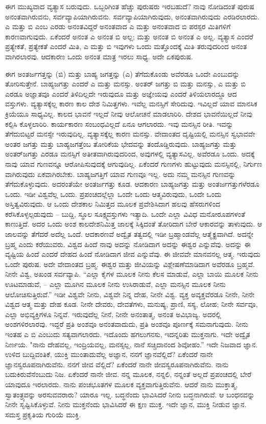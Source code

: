 ಈಗ ಮುಖ್ಯವಾದ ವ್ಯತ್ಯಾಸ ಬರುವುದು. ಒಬ್ಬರಿಗಿಂತ ಹೆಚ್ಚು ಪುರುಷರು ಇರಬಹುದೆ? ನಾವು ನೋಡಿದಂತೆ ಪುರುಷ ಅನಂತವಾಗಿರುವನು, ಸರ್ವವ್ಯಾಪಿಯಾಗಿರುವನು. ಸರ್ವವ್ಯಾಪಿಯಾಗಿರುವುದು, ಅನಂತವಾಗಿರುವುದು ಎರಡಿರಲಾರದು. ಎ ಮತ್ತು ಬಿ ಎಂಬ ಎರಡು ಅನಂತವಿದ್ದರೆ ಅನಂತವಾದ ಎ ಮತ್ತು ಅನಂತವಾದ ಬಿ ಪರಸ್ಪರ ಮಿತಿಗಳಿಗೆ ಕಾರಣವಾಗುವುದು. ಏಕೆಂದರೆ ಅನಂತ ಎ ಅನಂತ ಬಿ ಅಲ್ಲ; ಮತ್ತು ಅನಂತ ಬಿ ಅನಂತ ಎ ಅಲ್ಲ. ವ್ಯತ್ಯಾಸ ಎಂದರೆ ಪ್ರತ್ಯೇಕತೆ, ಪ್ರತ್ಯೇಕತೆ ಎಂದರೆ ಮಿತಿ, ಎ ಮತ್ತು ಬಿ ಇವುಗಳು ಒಂದು ಮತ್ತೊಂದಕ್ಕೆ ಮಿತಿ ತರುವುದರಿಂದ ಅನಂತ ವಾಗಿರಲಾರವು. ಆದಕಾರಣ ಒಂದು ಅನಂತ ಮಾತ್ರ ಇರಲು ಸಾಧ್ಯ. ಅದೇ ಏಕಪುರುಷ.

ಈಗ ಅಂತರ್ಜಗತ್ತನ್ನು (ಬಿ) ಮತ್ತು ಬಾಹ್ಯ ಜಗತ್ತನ್ನು (ಎ) ತೆಗೆದುಕೊಂಡು ಅವೆರಡೂ ಒಂದೇ ಎಂಬುದನ್ನು ತೋರಿಸುತ್ತೇನೆ. ಬಾಹ್ಯಜಗತ್ತು ಎಂದರೆ ಎ ಮತ್ತು ಮನಸ್ಸು. ಅಂತರ್‌ ಜಗತ್ತು ಬಿ ಮತ್ತು ಮನಸ್ಸು, ಎ ಮತ್ತು ಬಿ ಎರಡೂ ಅಜ್ಞಾತವೂ ಎಂದರೆ ತಿಳಿದಿಲ್ಲದೇ ಇರುವುದೂ ಮತ್ತು ಅಜ್ಞೇಯವು ಎಂದರೆ ತಿಳಿಯಲಾರದ್ದೂ ಆದ ವಸ್ತುಗಳು. ವ್ಯತ್ಯಾಸಕ್ಕೆಲ್ಲ ಕಾರಣ ಕಾಲ ದೇಶ ನಿಮಿತ್ತಗಳು. ಇವೆಲ್ಲ ಮನಸ್ಸಿಗೆ ಸೇರಿದುವು. ಇವಿಲ್ಲದೆ ಯಾವ ಮಾನಸಿಕ ಕ್ರಿಯೆಯೂ ಸಾಧ್ಯವಿಲ್ಲ. ಕಾಲದ ಭಾವನೆ ಇಲ್ಲದೆ ನೀವು ಆಲೋಚನೆ ಮಾಡಲಾರಿರಿ. ದೇಶದ ಭಾವನೆಯಿಲ್ಲದೆ ನೀವು ಕಲ್ಪಿಸಿ ಕೊಳ್ಳಲಾರಿರಿ. ಕಾರ್ಯಕಾರಣ ಸಂಬಂಧವಿಲ್ಲದೆ ಏನೂ ಆಗಲಾರದು. ಇವು ಮನಸ್ಸಿನ ರೀತಿ. ಇವನ್ನು ತೆಗೆದುಬಿಟ್ಟರೆ ಮನಸ್ಸೇ ಇರುವುದಿಲ್ಲ. ವ್ಯತ್ಯಾಸಕ್ಕೆಲ್ಲ ಕಾರಣ ಮನಸ್ಸು. ವೇದಾಂತದ ದೃಷ್ಟಿಯಲ್ಲಿ ಮನಸ್ಸಿನ ಸ್ವಭಾವವೇ ಅಂತರ ಜಗತ್ತು ಮತ್ತು ಬಾಹ್ಯಜಗತ್ತೆಂಬ ತೋರಿಕೆಯ ಭೇದವನ್ನು ತಂದೊಡ್ಡಿರುವುದು. ಬಾಹ್ಯಜಗತ್ತು ಮತ್ತು ಅಂತರ್‌ಜಗತ್ತು ಎರಡೂ ಮನಸ್ಸಿಗೆ ಅತೀತವಾಗಿರುವುದರಿಂದ, ಅವುಗಳಲ್ಲಿ ವ್ಯತ್ಯಾಸವಿಲ್ಲ. ಅವೆರಡೂ ಒಂದು. ಅದಕ್ಕೆ ನಾವು ಯಾವ ಗುಣವನ್ನೂ ಆರೋಪಿಸುವುದಕ್ಕೆ ಆಗುವುದಿಲ್ಲ. ಏಕೆಂದರೆ ಗುಣಗಳು ಹುಟ್ಟುವುದು ಮನಸ್ಸಿನಲ್ಲಿ, ನಿರ್ಗುಣ ವಾಗಿರುವುದು ಏಕವಾಗಿರಬೇಕು. ಬಾಹ್ಯಜಗತ್ತಿಗೆ ಯಾವ ಗುಣವೂ ಇಲ್ಲ. ಅದು ನಮ್ಮ ಮನಸ್ಸಿನ ಗುಣವನ್ನು ತೆಗೆದುಕೊಳ್ಳುವುದು. ಅದರಂತೆಯೇ ಅಂತರ್ಜಗತ್ತು ಕೂಡ. ಆದಕಾರಣ ಬಾಹ್ಯಜಗತ್ತು ಮತ್ತು ಅಂತರ್ಜಗತ್ತುಗಳೆರಡೂ ಒಂದು. ಇಡೀ ವಿಶ್ವವೆಲ್ಲ ಒಂದು. ಪ್ರಪಂಚದಲ್ಲೆಲ್ಲಾ ಒಂದೇ ಒಂದು ಆತ್ಮವಿರುವುದು, ಒಂದೇ ಒಂದು ಅಸ್ತಿತ್ವವಿರುವುದು. ಆ ಒಂದು ದೇಶಕಾಲ ನಿಮಿತ್ತದ ಮೂಲಕ ಪ್ರವೇಶಿಸಿದಾಗ ಹಲವು ಹೆಸರುಗಳಿಂದ ಕರೆಸಿಕೊಳ್ಳಲ್ಪಡುವುದು – ಬುದ್ದಿ, ಸ್ಥೂಲ ಸೂಕ್ಷ್ಮವಸ್ತುಗಳು ಇತ್ಯಾದಿ. ಒಂದೇ ಎಲ್ಲಾ ವಿವಿಧ ಮನೋರೂಪಗಳಂತೆ ಕಾಣುತ್ತಿದೆ. ಅದರ ಒಂದು ಅಂಶ ಕಾಲದೇಶನಿಮಿತ್ತ ಜಾಲಕ್ಕೆ ಸಿಕ್ಕಿದಂತೆ ತೋರಿದಾಗ ಬೇರೆ ಆಕಾರವನ್ನು ತಾಳುವುದು. ಆ ಜಾಲವನ್ನು ತೆಗೆದರೆ ಅದೆಲ್ಲ ಒಂದೆ. ಆದಕಾರಣವೆ ಅದ್ವೈತ ತತ್ವದಲ್ಲಿ ಇಡೀ ಬ್ರಹ್ಮಾಂಡವೆಲ್ಲ ಆತ್ಮೈಕ್ಯವಾಗಿದೆ. ಅದನ್ನೇ ಬ್ರಹ್ಮ ಎಂದು ಕರೆಯುವರು. ವಿಶ್ವದ ಹಿಂದೆ ನಾವು ಅದನ್ನು ನೋಡಿದಾಗ ಅದನ್ನು ಈಶ್ವರ ಎನ್ನುವೆವು. ಅದನ್ನು ಈ ವ್ಯಷ್ಟಿಯ ಹಿಂದೆ ಎಂದರೆ ದೇಹದ ಹಿಂದೆ ನೋಡಿದಾಗ ಜೀವ ಎನ್ನುವೆವು. ಈ ಜೀವವೇ ಮಾನವನಲ್ಲ ಆತ್ಮ. ಇರುವುದು ಒಂದೇ ಪುರುಷ. ಅದೇ ವೇದಾಂತದ ಬ್ರಹ್ಮ. ಈಶ್ವರ ಮತ್ತು ಜೀವಿಯನ್ನು ವಿಶ್ಲೇಷಣೆಮಾಡಿದಾಗ ಅವೆರಡೂ ಬ್ರಹ್ಮವೆ. ನೀನೇ ವಿಶ್ವ, ಅಖಂಡ ಸರ್ವವ್ಯಾಪಿ. “ಎಲ್ಲಾ ಕೈಗಳ ಮೂಲಕ ನೀನು ಕೆಲಸ ಮಾಡುವೆ, ಎಲ್ಲಾ ಬಾಯಿ ಮೂಲಕ ನೀನು ಊಟಮಾಡುವೆ, – ಎಲ್ಲಾ ಮೂಗಿನ ಮೂಲಕ ನೀನು ಉಸಿರಾಡುವೆ, ಎಲ್ಲಾ ಮನಸ್ಸಿನ ಮೂಲಕ ನೀನು ಆಲೋಚಿಸುತ್ತಿರುವೆ.'' ಇಡೀ ವಿಶ್ವವೇ ನೀನು, ವಿಶ್ವವೇ ನಿನ್ನ ದೇಹ, ನೀನೇ ವಿಶ್ವ. ವ್ಯಕ್ತ ಅವ್ಯಕ್ತವೆರಡೂ ನೀನೇ, ನೀನೇ ವಿಶ್ವದ ಆತ್ಮ ಮತ್ತು ದೇಹ ಕೂಡ. ನೀನೇ ದೇವರು, ದೇವತೆಗಳು, ಮನುಷ್ಯ, ಪ್ರಾಣಿ, ಸಸ್ಯ, ಲೋಹ; ನೀನೇ ಸರ್ವವೂ, ಎಲ್ಲಾ ಅಭಿವ್ಯಕ್ತಿಗಳೂ ನಿನ್ನವೆ. ಇರುವುದೆಲ್ಲ ನೀನೆ, ನೀನೇ ಅನಂತಾತ್ಮ, ಅನಂತ ಅವಿಭಾಜ್ಯ. ಅದರಲ್ಲಿ ಅಂಶಗಳಿರಲಾರವು. ಇದ್ದರೆ ಪ್ರತಿ ಅಂಶವೂ ಅನಂತವಾದುದು, ಪ್ರತಿ ಅಂಶವೂ ಪೂರ್ಣಕ್ಕೆ ಸಮನಾಗುವುದು. ನೀನು ಇಂತಹ ಎ ಬಿ ಎಂಬುದು ಸತ್ಯವಾಗಲಾರದು. ಇದೊಂದು ಹಗಲುಗನಸು, ಇದನ್ನರಿತು ಮುಕ್ತನಾಗು. ಇದೇ ಅದ್ವೈತ ನಿರ್ಣಯ. "ನಾನು ದೇಹವಲ್ಲ, ಇಂದ್ರಿಯವಲ್ಲ, ಮನಸ್ಸಲ್ಲ, ನಾನೆ ಸಚ್ಚಿದಾನಂದ ಶಿವೋಹಂ.'' ಇದೇ ನಿಜವಾದ ಜ್ಞಾನ. ಉಳಿದ ಬುದ್ದಿವಂತಿಕೆ, ಯುಕ್ತಿ ಮುಂತಾದುವೆಲ್ಲ ಅಜ್ಞಾನ, ನನಗೆ ಜ್ಞಾನವೆಲ್ಲಿದೆ? ಏಕೆಂದರೆ ನಾನೇ ಜ್ಞಾನಸ್ವರೂಪನಾಗಿರುವೆನು. ನನಗೆ ಜೀವ ವೆಲ್ಲಿದೆ? ಏಕೆಂದರೆ ನಾನೇ ಜೀವಸ್ವರೂಪನಾಗಿರುವೆನು. ನಾನು ಬದುಕಿರುವೆನೆಂಬುದು ನಿಜ. ಏಕೆಂದರೆ ನಾನೇ ಜೀವ. ನನ್ನ ಮೂಲಕ, ನನ್ನಲಿ, ನನ್ನಂತೆ ಅಲ್ಲದೆ ಪ್ರಪಂಚದಲ್ಲಿ ಬೇರೆ ಯಾವುದೂ ಇರಲಾರದು. ನಾನು ಪಂಚಭೂತಗಳ ಮೂಲಕ ವ್ಯಕ್ತವಾಗುತ್ತಿರುವೆನು. ಆದರೆ ನಾನು ಮುಕ್ತಾತ್ಮ, ಸ್ವಾತಂತ್ರ್ಯವನ್ನು ಅರಸುವವರಾರು? ಯಾರೂ ಇಲ್ಲ. ಬದ್ಧನೆಂದು ಭಾವಿಸಿದರೆ ನೀನು ಬದ್ಧನಾಗಿರುವೆ. ಆ ಬಂಧನವನ್ನು ನೀನೇ ಸೃಷ್ಟಿಸಿಕೊಳ್ಳುವೆ. ನೀನು ಮುಕ್ತನೆಂದು ಭಾವಿಸಿದರೆ ಈ ಕ್ಷಣ ಮುಕ್ತ. ಇದೇ ಜ್ಞಾನ, ಮುಕ್ತಿ ನೀಡುವ ಜ್ಞಾನ. ಸಮಸ್ತ ಪ್ರಕೃತಿಯ ಗುರಿಯೆ ಮುಕ್ತಿ.

